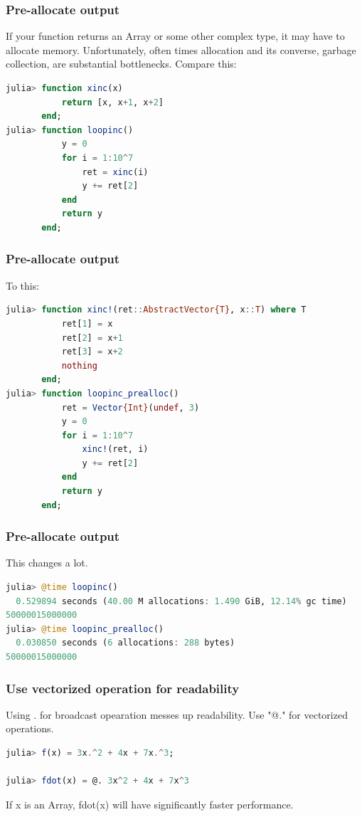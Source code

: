 \documentclass{beamer}
\begin{document}
\begin{frame}[fragile]
\frametitle{Pre-allocate output}
If your function returns an Array or some other complex type, it may have to allocate memory. Unfortunately, often times allocation and its converse, garbage collection, are substantial bottlenecks. Compare this:
\begin{lstlisting}[language=julia]
julia> function xinc(x)
           return [x, x+1, x+2]
       end;
julia> function loopinc()
           y = 0
           for i = 1:10^7
               ret = xinc(i)
               y += ret[2]
           end
           return y
       end;
\end{lstlisting}
\end{frame}

\begin{frame}[fragile]
\frametitle{Pre-allocate output}
To this:
\begin{lstlisting}[language=julia]
julia> function xinc!(ret::AbstractVector{T}, x::T) where T
           ret[1] = x
           ret[2] = x+1
           ret[3] = x+2
           nothing
       end;
julia> function loopinc_prealloc()
           ret = Vector{Int}(undef, 3)
           y = 0
           for i = 1:10^7
               xinc!(ret, i)
               y += ret[2]
           end
           return y
       end;
\end{lstlisting}
\end{frame}

\begin{frame}[fragile]
\frametitle{Pre-allocate output}
This changes a lot.
\begin{lstlisting}[language=julia]
julia> @time loopinc()
  0.529894 seconds (40.00 M allocations: 1.490 GiB, 12.14% gc time)
50000015000000
julia> @time loopinc_prealloc()
  0.030850 seconds (6 allocations: 288 bytes)
50000015000000
\end{lstlisting}
\end{frame}

\begin{frame}[fragile]
\frametitle{Use vectorized operation for readability}
Using $.$ for broadcast opearation messes up readability. Use "@." for vectorized operations.
\begin{lstlisting}[language=julia]
julia> f(x) = 3x.^2 + 4x + 7x.^3;

julia> fdot(x) = @. 3x^2 + 4x + 7x^3
\end{lstlisting}
If x is an Array, fdot(x) will have significantly faster performance. 
\end{frame}
\end{document}
